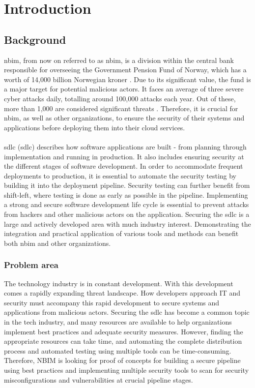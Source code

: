 \newpage
\thispagestyle{empty}
\mbox{}
\chapter{Introduction}

\section{Background} %
\acrlong{nbim}, from now on referred to as \acrshort{nbim}, is a division within the central bank responsible for overseeing the Government Pension Fund of Norway, which has a worth of 14,000 billion Norwegian kroner \cite{nbimwebsite}. Due to its significant value, the fund is a major target for potential malicious actors. It faces an average of three severe cyber attacks daily, totalling around 100,000 attacks each year. Out of these, more than 1,000 are considered significant threats \cite{nbimattacks}. Therefore, it is crucial for \acrshort{nbim}, as well as other organizations, to ensure the security of their systems and applications before deploying them into their cloud services. 
\\~\\
\acrlong{sdlc} (\acrshort{sdlc}) describes how software applications are built - from planning through implementation and running in production. It also includes ensuring security at the different stages of software development. In order to accommodate frequent deployments to production, it is essential to automate the security testing by building it into the deployment pipeline. Security testing can further benefit from shift-left, where testing is done as early as possible in the pipeline. Implementing a strong and secure software development life cycle is essential to prevent attacks from hackers and other malicious actors on the application. Securing the \acrshort{sdlc} is a large and actively developed area with much industry interest. Demonstrating the integration and practical application of various tools and methods can benefit both \acrshort{nbim} and other organizations.

\subsection{Problem area}
The technology industry is in constant development. With this development comes a rapidly expanding threat landscape. How developers approach IT and security must accompany this rapid development to secure systems and applications from malicious actors. Securing the \acrlong{sdlc} has become a common topic in the tech industry, and many resources are available to help organizations implement best practices and adequate security measures. However, finding the appropriate resources can take time, and automating the complete distribution process and automated testing using multiple tools can be time-consuming. Therefore, NBIM is looking for proof of concepts for building a secure pipeline using best practices and implementing multiple security tools to scan for security misconfigurations and vulnerabilities at crucial pipeline stages. 

